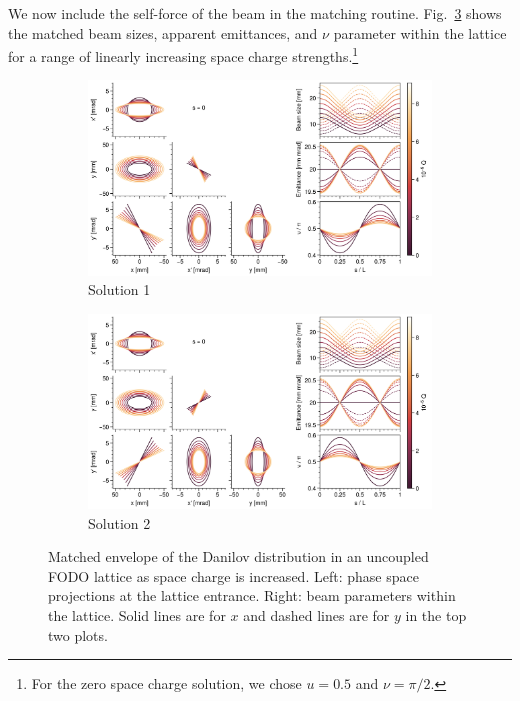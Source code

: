We now include the self-force of the beam in the matching routine. Fig.~\ref{fig:matched_vs_sc_fodo} shows the matched beam sizes, apparent emittances, and $\nu$ parameter within the lattice for a range of linearly increasing space charge strengths.\footnote{For the zero space charge solution, we chose $u = 0.5$ and $\nu = \pi/2$.}
%
\begin{figure}[!p]
    \begin{subfigure}{1.0\textwidth}
        \includegraphics[width=\textwidth]{Images/chapter2/matched_vs_sc_fodo_mode1.png}
        \caption{Solution 1}
        \label{fig:matched_vs_sc_fodo_a}
    \end{subfigure}
    \vfill
    \vfill
    \begin{subfigure}{1.0\textwidth}
        \centering
        \includegraphics[width=\textwidth]{Images/chapter2/matched_vs_sc_fodo_mode2.png}
        \caption{Solution 2}
        \label{fig:matched_vs_sc_fodo_b}
    \end{subfigure}
    \caption{Matched envelope of the Danilov distribution in an uncoupled FODO lattice as space charge is increased. Left: phase space projections at the lattice entrance. Right: beam parameters within the lattice. Solid lines are for $x$ and dashed lines are for $y$ in the top two plots.}
    \label{fig:matched_vs_sc_fodo}
\end{figure}
